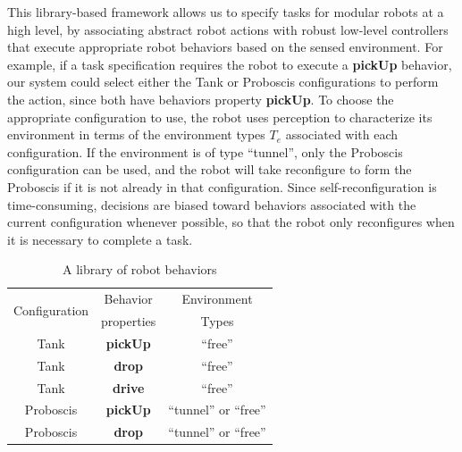 \documentclass[conference]{IEEEtran}
\begin{document}
This library-based framework allows us to specify tasks for modular robots at a high level, by associating abstract robot actions with robust low-level controllers that execute appropriate robot behaviors based on the sensed environment. For example, if a task specification requires the robot to execute a \textbf{pickUp} behavior, our system could select either the Tank or Proboscis configurations to perform the action, since both have behaviors property \textbf{pickUp}. To choose the appropriate configuration to use, the robot uses perception to characterize its environment in terms of the environment types $T_e$ associated with each configuration. If the environment is of type ``tunnel'', only the Proboscis configuration can be used, and the robot will take  reconfigure to form the Proboscis if it is not already in that configuration. Since self-reconfiguration is time-consuming, decisions are biased toward behaviors associated with the current configuration whenever possible, so that the robot only reconfigures when it is necessary to complete a task.
%
\begin{table}
\centering
\begin{tabular}{ |c|c|c| } 
 \hline
 \multirow{2}{6em}{Configuration} & Behavior & Environment \\
 & properties & Types \\
 \hline
 Tank & \textbf{pickUp} & ``free'' \\\hline
 Tank & \textbf{drop} & ``free'' \\\hline
 Tank & \textbf{drive} & ``free''\\ \hline
 Proboscis & \textbf{pickUp} & ``tunnel'' or ``free''\\ \hline
 Proboscis & \textbf{drop} &``tunnel'' or ``free'' \\ 
 \hline
\end{tabular}
\caption{A library of robot behaviors}
\label{table:1}
\vspace{-1em}
\end{table}

\end{document}
